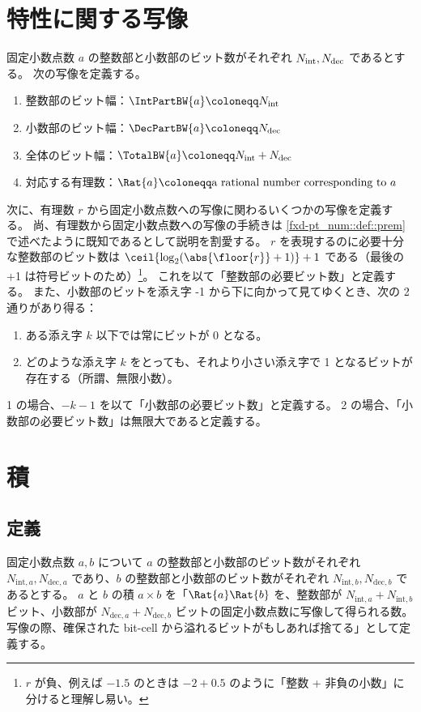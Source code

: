     \section{特性に関する写像}
        固定小数点数 $a$ の整数部と小数部のビット数がそれぞれ ${N_\text{int}}, {N_\text{dec}}$ であるとする。
        次の写像を定義する。
        \begin{enumerate}
            \item 整数部のビット幅：$\IntPartBW{a} \coloneqq \Ni$
            \item 小数部のビット幅：$\DecPartBW{a} \coloneqq \Nd$
            \item 全体のビット幅：$\TotalBW{a} \coloneqq \Ni + \Nd$
            \item 対応する有理数：$\Rat{a} \coloneqq \text{a rational number corresponding to }a$
        \end{enumerate}
        次に、有理数 $r$ から固定小数点数への写像に関わるいくつかの写像を定義する。
        尚、有理数から固定小数点数への写像の手続きは \ref{fxd-pt_num::def::prem} で述べたように既知であるとして説明を割愛する。
        $r$ を表現するのに必要十分な整数部のビット数は $\ceil{\log_2(\abs{\floor{r}}+1)}+1$ である（最後の +1 は符号ビットのため）\footnote{$r$ が負、例えば $-1.5$ のときは $-2+0.5$ のように「整数 + 非負の小数」に分けると理解し易い。}。
        これを以て「整数部の必要ビット数」と定義する。
        また、小数部のビットを添え字 -1 から下に向かって見てゆくとき、次の 2 通りがあり得る：
        \begin{enumerate}
            \item ある添え字 $k$ 以下では常にビットが 0 となる。
            \item どのような添え字 $k$ をとっても、それより小さい添え字で 1 となるビットが存在する（所謂、無限小数）。
        \end{enumerate}
        1 の場合、$-k-1$ を以て「小数部の必要ビット数」と定義する。
        2 の場合、「小数部の必要ビット数」は無限大であると定義する。
    \section{積}
        \newcommand{\Nia}{{N_{\text{int},a}}}
        \newcommand{\Nda}{{N_{\text{dec},a}}}
        \newcommand{\Nib}{{N_{\text{int},b}}}
        \newcommand{\Ndb}{{N_{\text{dec},b}}}
        \subsection{定義}
            固定小数点数 $a, b$ について $a$ の整数部と小数部のビット数がそれぞれ $\Nia, \Nda$ であり、$b$ の整数部と小数部のビット数がそれぞれ $\Nib, \Ndb$ であるとする。
            $a$ と $b$ の積 $a\times b$ を「$\Rat{a}\Rat{b}$ を、整数部が $\Nia+\Nib$ ビット、小数部が $\Nda+\Ndb$ ビットの固定小数点数に写像して得られる数。写像の際、確保された bit-cell から溢れるビットがもしあれば捨てる」として定義する。
            \par
